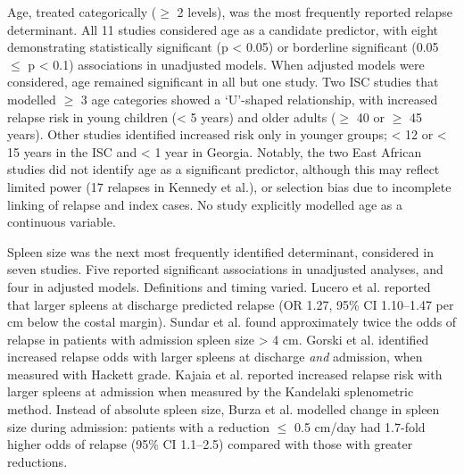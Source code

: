 Age, treated categorically ($\geq$ 2 levels), was the most frequently reported relapse determinant. All 11 studies considered age as a candidate predictor, with eight demonstrating statistically significant (p < 0.05) or borderline significant (0.05 $\leq$ p < 0.1) associations in unadjusted models\cite{burza2014, goyal2019, goyal2020, lucero2015, ostyn2014, rijal2013, sundar2019, kajaia2011}. When adjusted models were considered, age remained significant in all but one study\cite{sundar2019}. Two ISC studies that modelled $\geq$ 3 age categories showed a `U'-shaped relationship, with increased relapse risk in young children (< 5 years) and older adults ($\geq$ 40 or $\geq$ 45 years)\cite{burza2014, lucero2015}. Other studies identified increased risk only in younger groups; < 12 or < 15 years in the ISC\cite{goyal2019, goyal2020, rijal2013, sundar2019} and < 1 year in Georgia\cite{kajaia2011}. Notably, the two East African studies did not identify age as a significant predictor\cite{gorski2010, kennedy2024}, although this may reflect limited power (17 relapses in Kennedy et al.\cite{kennedy2024}), or selection bias due to incomplete linking of relapse and index cases\cite{gorski2010}. No study explicitly modelled age as a continuous variable.

Spleen size was the next most frequently identified determinant, considered in seven studies. Five reported significant associations in unadjusted analyses, and four in adjusted models\cite{burza2014, lucero2015, sundar2019, gorski2010, kajaia2011}. Definitions and timing varied. Lucero et al. reported that larger spleens at discharge predicted relapse (OR 1.27, 95\% CI 1.10--1.47 per cm below the costal margin). Sundar et al. found approximately twice the odds of relapse in patients with admission spleen size > 4 cm\cite{sundar2019}. Gorski et al. identified increased relapse odds with larger spleens at discharge \textit{and} admission, when measured with Hackett grade\cite{gorski2010}. Kajaia et al. reported increased relapse risk with larger spleens at admission when measured by the Kandelaki splenometric method\cite{kajaia2011, meliia2006}. Instead of absolute spleen size, Burza et al. modelled change in spleen size during admission: patients with a reduction $\leq$ 0.5 cm/day had 1.7-fold higher odds of relapse (95\% CI 1.1--2.5) compared with those with greater reductions\cite{burza2014}.

